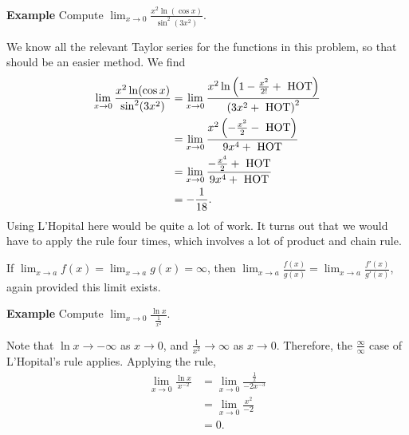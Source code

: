 \documentclass[twoside,openright,titlepage,a4paper]{book}
\begin{document}
\begin{sloppypar}
\textbf{Example} Compute $\displaystyle \lim_{x \rightarrow 0} \frac{x^2 \ln( \cos x)}{\sin^2(3x^2)} $. 
\begin{examplebox}
We know all the relevant Taylor series for the functions in this problem, so that should be an easier method. We find
\begin{align*}
\lim_{x\rightarrow 0} \frac{x^2 \ln(\cos x)}{\sin^2(3x^2)} &= \lim_{x \rightarrow 0} \frac{x^2 \ln \left(1-\frac{x^2}{2!} + \hbox{ HOT}\right)}{\left(3x^2 + \hbox{ HOT}\right)^2} \\
&= \lim_{x \rightarrow 0} \frac{x^2 \left(-\frac{x^2}{2} - \hbox{ HOT}\right)}{9x^4 + \hbox{ HOT}} \\
&= \lim_{x \rightarrow 0} \frac{-\frac{x^4}{2} + \hbox{ HOT}}{9 x^4 + \hbox{ HOT}} \\
&= -\frac{1}{18}. 
\end{align*}
Using L'Hopital here would be quite a lot of work. It turns out that we would have to apply the rule four times, which involves a lot of product and chain rule.
\end{examplebox}

\begin{definitionbox}[title=\textbf{L'Hopital's Rule, $\frac{\infty}{\infty}$ case}]
If $\displaystyle \lim_{x\rightarrow a} f(x) = \lim_{x \rightarrow a} g(x) = \infty$, then $\displaystyle\lim_{x \rightarrow a} \frac{f(x)}{g(x)} = \lim_{x\rightarrow a} \frac{f'(x)}{g'(x)}$, again provided this limit exists.	
\end{definitionbox}

\textbf{Example} Compute $\displaystyle \lim_{x \rightarrow 0} \frac{\ln x}{\frac{1}{x^2}}$.
\begin{examplebox}
Note that $\ln x \rightarrow -\infty$ as $x \rightarrow 0$, and $\frac{1}{x^2} \rightarrow \infty$ as $x \rightarrow 0$. Therefore, the $\frac{\infty}{\infty}$ case of L'Hopital's rule applies. Applying the rule,
\begin{align*}
\lim_{x \rightarrow 0} \frac{\ln x}{x^{-2}} &= \lim_{x \rightarrow 0} \frac{\frac{1}{x}}{-2 x^{-3}} \\
&= \lim_{x\rightarrow 0} \frac{x^2}{-2} \\
&= 0.
\end{align*}
\end{examplebox}


\end{sloppypar}
\end{document}

